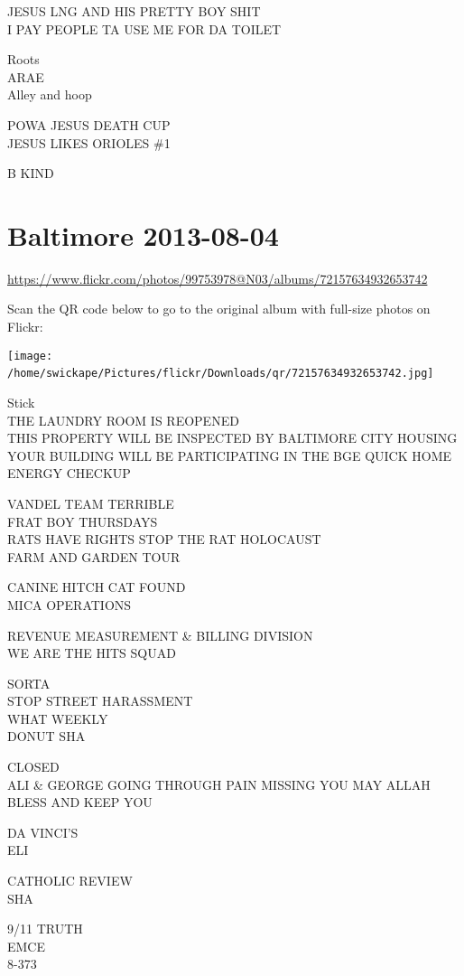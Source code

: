 \documentclass[10pt,letterpaper]{article}
\begin{document}
JESUS LNG AND HIS PRETTY BOY SHIT\\
I PAY PEOPLE TA USE ME FOR DA TOILET

Roots\\
ARAE\\
Alley and hoop

POWA JESUS DEATH CUP\\
JESUS LIKES ORIOLES \#1

B KIND
\

\section*{Baltimore 2013-08-04}

\url{https://www.flickr.com/photos/99753978@N03/albums/72157634932653742}

Scan the QR code below to go to the original album with full-size photos on Flickr:

\texttt{[image: /home/swickape/Pictures/flickr/Downloads/qr/72157634932653742.jpg]}
\

Stick\\
THE LAUNDRY ROOM IS REOPENED\\
THIS PROPERTY WILL BE INSPECTED BY BALTIMORE CITY HOUSING\\
YOUR BUILDING WILL BE PARTICIPATING IN THE BGE QUICK HOME ENERGY CHECKUP

VANDEL TEAM TERRIBLE\\
FRAT BOY THURSDAYS\\
RATS HAVE RIGHTS STOP THE RAT HOLOCAUST\\
FARM AND GARDEN TOUR

CANINE HITCH CAT FOUND\\
MICA OPERATIONS

REVENUE MEASUREMENT \& BILLING DIVISION\\
WE ARE THE HITS SQUAD

SORTA\\
STOP STREET HARASSMENT\\
WHAT WEEKLY\\
DONUT SHA

CLOSED\\
ALI \& GEORGE GOING THROUGH PAIN MISSING YOU MAY ALLAH BLESS AND KEEP YOU

DA VINCI'S\\
ELI

CATHOLIC REVIEW\\
SHA

9/11 TRUTH\\
EMCE\\
8{-}373
\end{document}
